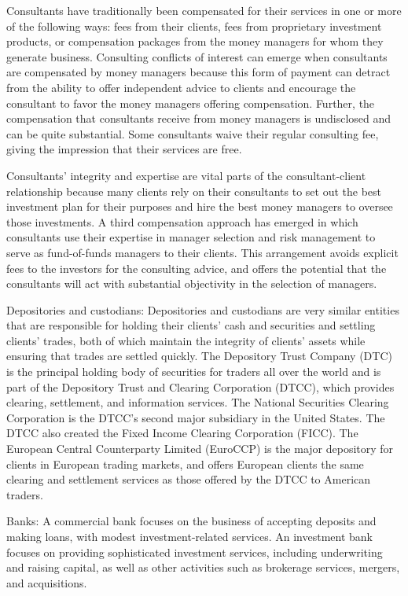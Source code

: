 \documentclass[11pt]{article}
\begin{document}
Consultants have traditionally been compensated for their services in one or more of the following ways: fees from their clients, fees from proprietary investment products, or compensation packages from the money managers for whom they generate business. Consulting conflicts of interest can emerge when consultants are compensated by money managers because this form of payment can detract from the ability to offer independent advice to clients and encourage the consultant to favor the money managers offering compensation. Further, the compensation that consultants receive from money managers is undisclosed and can be quite substantial. Some consultants waive their regular consulting fee, giving the impression that their services are free.

Consultants' integrity and expertise are vital parts of the consultant-client relationship because many clients rely on their consultants to set out the best investment plan for their purposes and hire the best money managers to oversee those investments. A third compensation approach has emerged in which consultants use their expertise in manager selection and risk management to serve as fund-of-funds managers to their clients. This arrangement avoids explicit fees to the investors for the consulting advice, and offers the potential that the consultants will act with substantial objectivity in the selection of managers.

Depositories and custodians: Depositories and custodians are very similar entities that are responsible for holding their clients' cash and securities and settling clients' trades, both of which maintain the integrity of clients' assets while ensuring that trades are settled quickly. The Depository Trust Company (DTC) is the principal holding body of securities for traders all over the world and is part of the Depository Trust and Clearing Corporation (DTCC), which provides clearing, settlement, and information services. The National Securities Clearing Corporation is the DTCC's second major subsidiary in the United States. The DTCC also created the Fixed Income Clearing Corporation (FICC). The European Central Counterparty Limited (EuroCCP) is the major depository for clients in European trading markets, and offers European clients the same clearing and settlement services as those offered by the DTCC to American traders.

Banks: A commercial bank focuses on the business of accepting deposits and making loans, with modest investment-related services. An investment bank focuses on providing sophisticated investment services, including underwriting and raising capital, as well as other activities such as brokerage services, mergers, and acquisitions.
\end{document}

